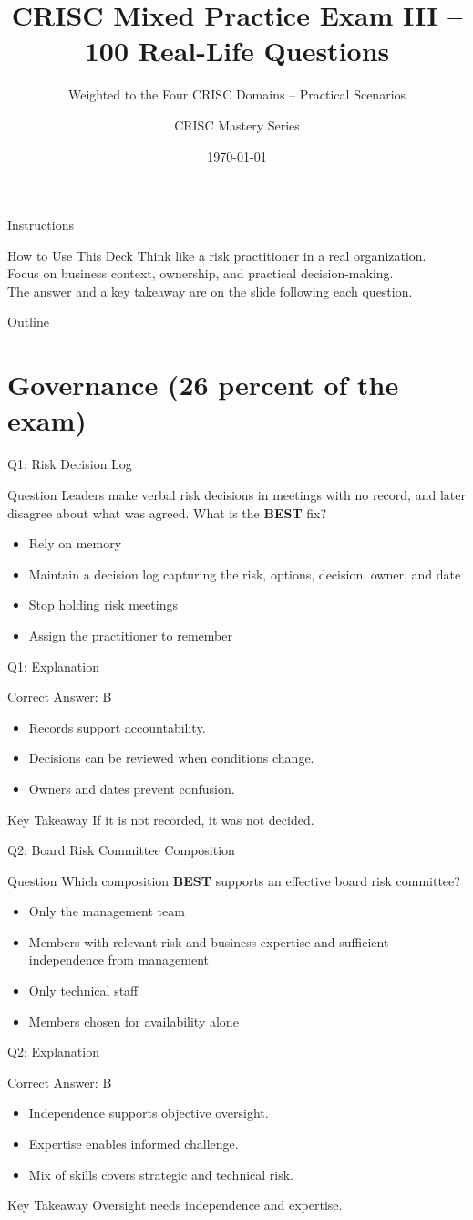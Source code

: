\documentclass[aspectratio=169]{beamer}
\title{CRISC Mixed Practice Exam III -- 100 Real-Life Questions}
\subtitle{Weighted to the Four CRISC Domains -- Practical Scenarios}
\author{CRISC Mastery Series}
\date{\today}
\newcommand{\hq}[7]{%
	\begin{frame}{Q#1: #2}
		\begin{block}{Question}
			#3
		\end{block}
		\begin{itemize}
			#4
		\end{itemize}
	\end{frame}
	\begin{frame}{Q#1: Explanation}
		\begin{block}{Correct Answer: #5}
			\begin{itemize}
				#6
			\end{itemize}
		\end{block}
		\begin{alertblock}{Key Takeaway}
			#7
		\end{alertblock}
	\end{frame}
}
\begin{document}
	\begin{frame}
		\titlepage
	\end{frame}

	\begin{frame}{Instructions}
		\begin{alertblock}{How to Use This Deck}
			Think like a risk practitioner in a real organization.\\
			Focus on business context, ownership, and practical decision-making.\\
			The answer and a key takeaway are on the slide following each question.
		\end{alertblock}
	\end{frame}

	\begin{frame}{Outline}
		\tableofcontents
	\end{frame}

	\section{Governance (26 percent of the exam)}

	\hq{1}{Risk Decision Log}
	{Leaders make verbal risk decisions in meetings with no record, and later disagree about what was agreed. What is the \textbf{BEST} fix?}
	{\item[\textbf{(A)}] Rely on memory
		\item[\textbf{(B)}] Maintain a decision log capturing the risk, options, decision, owner, and date
		\item[\textbf{(C)}] Stop holding risk meetings
		\item[\textbf{(D)}] Assign the practitioner to remember}
	{B}
	{\item Records support accountability.
		\item Decisions can be reviewed when conditions change.
		\item Owners and dates prevent confusion.}
	{If it is not recorded, it was not decided.}

	\hq{2}{Board Risk Committee Composition}
	{Which composition \textbf{BEST} supports an effective board risk committee?}
	{\item[\textbf{(A)}] Only the management team
		\item[\textbf{(B)}] Members with relevant risk and business expertise and sufficient independence from management
		\item[\textbf{(C)}] Only technical staff
		\item[\textbf{(D)}] Members chosen for availability alone}
	{B}
	{\item Independence supports objective oversight.
		\item Expertise enables informed challenge.
		\item Mix of skills covers strategic and technical risk.}
	{Oversight needs independence and expertise.}
\end{document}
